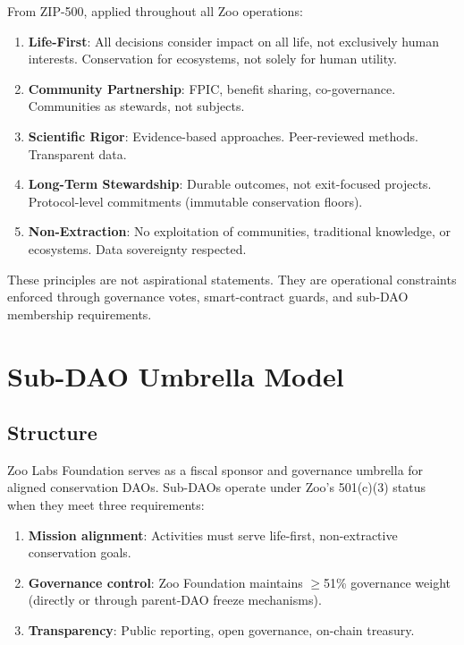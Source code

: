 \documentclass[11pt,letterpaper]{article}
\begin{document}
From ZIP-500, applied throughout all Zoo operations:

\begin{enumerate}
    \item \textbf{Life-First}: All decisions consider impact on all life, not exclusively human interests. Conservation for ecosystems, not solely for human utility.
    \item \textbf{Community Partnership}: FPIC, benefit sharing, co-governance. Communities as stewards, not subjects.
    \item \textbf{Scientific Rigor}: Evidence-based approaches. Peer-reviewed methods. Transparent data.
    \item \textbf{Long-Term Stewardship}: Durable outcomes, not exit-focused projects. Protocol-level commitments (immutable conservation floors).
    \item \textbf{Non-Extraction}: No exploitation of communities, traditional knowledge, or ecosystems. Data sovereignty respected.
\end{enumerate}

These principles are not aspirational statements. They are operational constraints enforced through governance votes, smart-contract guards, and sub-DAO membership requirements.

\section{Sub-DAO Umbrella Model}
\label{sec:subdao}

\subsection{Structure}

Zoo Labs Foundation serves as a fiscal sponsor and governance umbrella for aligned conservation DAOs. Sub-DAOs operate under Zoo's 501(c)(3) status when they meet three requirements:

\begin{enumerate}
    \item \textbf{Mission alignment}: Activities must serve life-first, non-extractive conservation goals.
    \item \textbf{Governance control}: Zoo Foundation maintains $\geq$51\% governance weight (directly or through parent-DAO freeze mechanisms).
    \item \textbf{Transparency}: Public reporting, open governance, on-chain treasury.
\end{enumerate}
\end{document}
